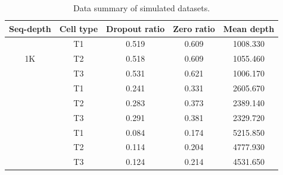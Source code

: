 \begin{table}[t]
\centering
\caption{Data summary of simulated datasets.}
\label{tab:proportion}
    \begin{tabular}{ccccc}
    \toprule
    Seq-depth & Cell type & Dropout ratio & Zero ratio & Mean depth \\
    \midrule
    \multirow{3}{*}{1K} & T1 & 0.519 & 0.609 & 1008.330 \\
     & T2 & 0.518 & 0.609 & 1055.460 \\
     & T3 & 0.531 & 0.621 & 1006.170 \\
    \addlinespace
    \multirow{3}{*}{2K} & T1 & 0.241 & 0.331 & 2605.670 \\
     & T2 & 0.283 & 0.373 & 2389.140 \\
     & T3 & 0.291 & 0.381 & 2329.720 \\
    \addlinespace
    \multirow{3}{*}{4K} & T1 & 0.084 & 0.174 & 5215.850 \\
     & T2 & 0.114 & 0.204 & 4777.930 \\
     & T3 & 0.124 & 0.214 & 4531.650 \\
    \bottomrule
    \end{tabular}
\end{table}
